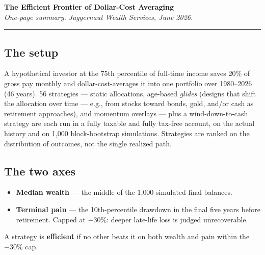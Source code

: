 \documentclass[9pt]{extarticle}
\begin{document}
\begin{center}
{\LARGE\bfseries The Efficient Frontier of Dollar-Cost Averaging}\\[2pt]
{\small\itshape One-page summary. Jaggernaut Wealth Services, June 2026.}\\[1pt]
{\color{brandred}\rule{\textwidth}{0.6pt}}
\end{center}

\subsection*{The setup}
A hypothetical investor at the 75th percentile of full-time income saves 20\% of gross pay monthly and dollar-cost-averages it into one portfolio over 1980--2026 (46 years). 56 strategies --- static allocations, age-based \emph{glides} (designs that shift the allocation over time --- e.g., from stocks toward bonds, gold, and/or cash as retirement approaches), and momentum overlays --- plus a wind-down-to-cash strategy are each run in a fully taxable and fully tax-free account, on the actual history and on 1{,}000 block-bootstrap simulations. Strategies are ranked on the distribution of outcomes, not the single realized path.

\subsection*{The two axes}
\begin{itemize}
\item \textbf{Median wealth} --- the middle of the 1{,}000 simulated final balances.
\item \textbf{Terminal pain} --- the 10th-percentile drawdown in the final five years before retirement. Capped at $-30\%$: deeper late-life loss is judged unrecoverable.
\end{itemize}
A strategy is \textbf{efficient} if no other beats it on both wealth and pain within the $-30\%$ cap.
\end{document}
